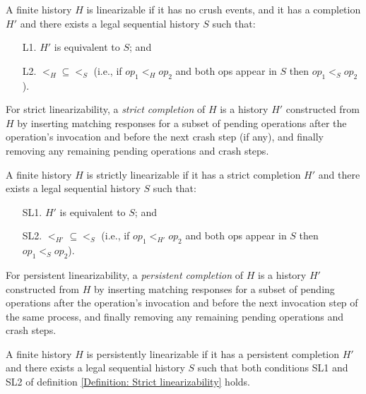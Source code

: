 \begin{definition} [Linearizability]
	\label{Definition: Linearizability}
	A finite history $H$ is linearizable if it has no crush events, and it has a completion $H'$ and there exists a legal sequential history $S$ such that:
	\begin{enumerate}
		\item [L1.] $H'$ is equivalent to $S$; and
		\item [L2.] $<_H \subseteq <_S$ (i.e., if $op_1 <_H op_2$ and both ops appear in $S$ then $op_1 <_S op_2$).
	\end{enumerate}
\end{definition}

For strict linearizability, a \textit{strict completion} of $H$ is a history $H'$ constructed from $H$ by inserting matching responses for a subset of pending operations after the operation’s invocation and before the next crash step (if any), and finally removing any remaining pending operations and crash steps.

\begin{definition} 
	\label{Definition: Strict linearizability} 
	A finite history $H$ is strictly linearizable if it has a strict completion $H'$ and there exists a legal sequential history $S$ such that:
	\begin{enumerate}
		\item [SL1.] $H'$ is equivalent to $S$; and
		\item [SL2.] $<_{H'} \subseteq <_S$ (i.e., if $op_1 <_{H'} op_2$ and both ops appear in $S$ then $op_1 <_S op_2$).
	\end{enumerate}
\end{definition}

For persistent linearizability, a \textit{persistent completion} of $H$ is a history $H'$ constructed from $H$ by inserting matching responses for a subset of pending operations after the operation’s invocation and before the next invocation step of the same process, and finally removing any remaining pending operations and crash steps.

\begin{definition} 
	\label{Definition: Persistent linearizability}
	A finite history $H$ is persistently linearizable if it has a persistent completion $H'$ and there exists a legal sequential history $S$ such that both conditions SL1 and SL2 of definition \ref{Definition: Strict linearizability} holds.
\end{definition}


